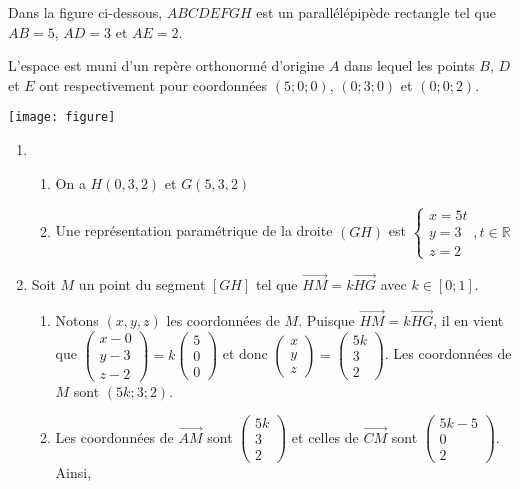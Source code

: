 \documentclass[11pt,fleqn, openany]{book} %
\begin{document}
\begin{solution}Dans la figure ci-dessous, $ABCDEFGH$ est un parallélépipède rectangle tel que
$AB = 5$, $AD = 3$ et $AE = 2$.

L'espace est muni d'un repère orthonormé d'origine $A$ dans lequel les points $B$, $D$ et $E$ ont
respectivement pour coordonnées $(5; 0; 0)$, $(0; 3; 0)$ et $(0; 0; 2)$.

\begin{center}
\texttt{[image: figure]}
\end{center}

\begin{enumerate}
\item \begin{enumerate}
\item On a $H(0,3,2)$ et $G(5,3,2)$
\item Une représentation paramétrique de la droite $(GH)$ est $\left\{\begin{array}{l}x=5t \\ y = 3 \\ z=2\end{array},t \in \mathbb{R} \right.$\end{enumerate}
\item Soit $M$ un point du segment $[GH]$ tel que $\overrightarrow{HM}=k \overrightarrow{HG}$ avec $k\in [0; 1]$.
\begin{enumerate}
\item Notons $(x,y,z)$ les coordonnées de $M$. Puisque $\overrightarrow{HM}=k \overrightarrow{HG}$, il en vient que $\begin{pmatrix}x-0 \\ y-3 \\ z-2 \end{pmatrix} = k\begin{pmatrix}5 \\0 \\0\end{pmatrix}$ et donc $\begin{pmatrix}x\\y\\z\end{pmatrix} = \begin{pmatrix}5k\\3\\2\end{pmatrix}$. Les coordonnées de $M$ sont $(5k ; 3 ; 2)$.
\item Les coordonnées de $\overrightarrow{AM}$ sont $\begin{pmatrix}5k \\ 3 \\ 2\end{pmatrix}$ et celles de $\overrightarrow{CM}$ sont $\begin{pmatrix}5k-5 \\0 \\ 2\end{pmatrix}$. Ainsi,

\end{enumerate}
\end{enumerate}
\end{solution}
\end{document}
